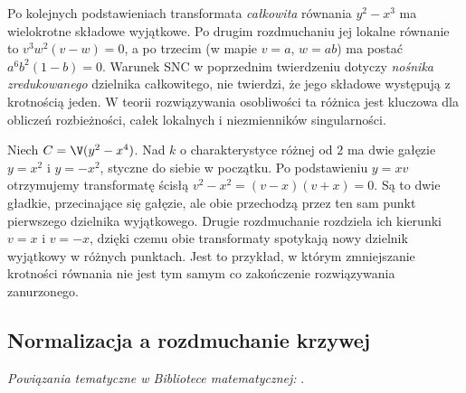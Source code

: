 \begin{uwaga}
Po kolejnych podstawieniach transformata \emph{całkowita}
równania $y^2-x^3$ ma wielokrotne składowe wyjątkowe.
Po drugim rozdmuchaniu jej lokalne równanie to
$v^3w^2(v-w)=0$, a po trzecim (w mapie $v=a$,
$w=ab$) ma postać $a^6b^2(1-b)=0$.
Warunek SNC w poprzednim twierdzeniu dotyczy
\emph{nośnika zredukowanego} dzielnika całkowitego,
nie twierdzi, że jego składowe występują z krotnością jeden.
W teorii rozwiązywania osobliwości ta różnica jest
kluczowa dla obliczeń rozbieżności, całek lokalnych
i niezmienników singularności.
\end{uwaga}

\begin{przyklad}
Niech $C=\V(y^2-x^4)$. Nad $k$ o charakterystyce
różnej od $2$ ma dwie gałęzie $y=x^2$ i $y=-x^2$,
styczne do siebie w początku. Po podstawieniu
$y=xv$ otrzymujemy transformatę ścisłą
$v^2-x^2=(v-x)(v+x)=0$. Są to dwie gładkie,
przecinające się gałęzie, ale obie przechodzą
przez ten sam punkt pierwszego dzielnika wyjątkowego.
Drugie rozdmuchanie rozdziela ich kierunki
$v=x$ i $v=-x$, dzięki czemu obie transformaty
spotykają nowy dzielnik wyjątkowy w różnych punktach.
Jest to przykład, w którym zmniejszanie krotności
równania nie jest tym samym co zakończenie
rozwiązywania zanurzonego.
\end{przyklad}

\subsection{Normalizacja a rozdmuchanie krzywej}

\noindent\emph{Powiązania tematyczne w Bibliotece matematycznej:} .


